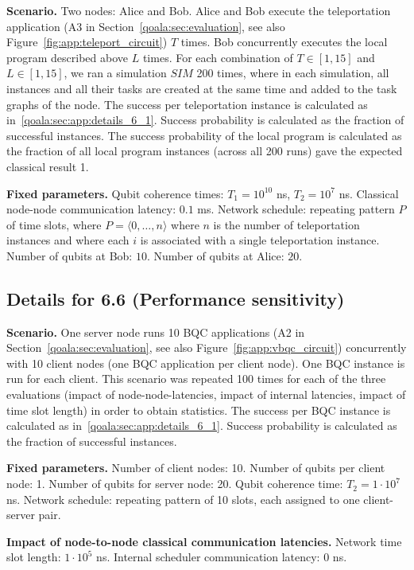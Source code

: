 \textbf{Scenario.}
Two nodes: Alice and Bob.
Alice and Bob execute the teleportation application (A3 in Section~\ref{qoala:sec:evaluation}, see also Figure~\ref{fig:app:teleport_circuit}) $T$ times.
Bob concurrently executes the local program described above $L$ times.
For each combination of $T \in [1, 15]$ and $L \in [1, 15]$, we ran a simulation $SIM$ 200 times, where in each simulation, all instances and all their tasks are created at the same time and added to the task graphs of the node.
The success per teleportation instance is calculated as in~\ref{qoala:sec:app:details_6_1}.
Success probability is calculated as the fraction of successful instances.
The success probability of the local program is calculated as the fraction of all local program instances (across all 200 runs) gave the expected classical result 1.

\textbf{Fixed parameters.}
Qubit coherence times: $T_1 = 10^{10}$ ns, $T_2 = 10^7$ ns.
Classical node-node communication latency: $0.1$ ms.
Network schedule: repeating pattern $P$ of time slots, where $P = \langle 0, \dots, n \rangle$ where $n$ is the number of teleportation instances and where each $i$ is associated with a single teleportation instance.
Number of qubits at Bob: $10$.
Number of qubits at Alice: $20$.


\subsection{Details for 6.6 (Performance sensitivity)}
\textbf{Scenario.}
One server node runs 10 BQC applications (A2 in Section~\ref{qoala:sec:evaluation}, see also Figure~\ref{fig:app:vbqc_circuit}) concurrently with 10 client nodes (one BQC application per client node).
One BQC instance is run for each client.
This scenario was repeated 100 times for each of the three evaluations (impact of node-node-latencies, impact of internal latencies, impact of time slot length) in order to obtain statistics.
The success per BQC instance is calculated as in~\ref{qoala:sec:app:details_6_1}.
Success probability is calculated as the fraction of successful instances.

\textbf{Fixed parameters.}
Number of client nodes: 10.
Number of qubits per client node: 1.
Number of qubits for server node: 20.
Qubit coherence time: $T_2 = 1\cdot 10^7$ ns.
Network schedule: repeating pattern of 10 slots, each assigned to one client-server pair.

\textbf{Impact of node-to-node classical communication latencies.}
Network time slot length: $1\cdot 10^5$ ns.
Internal scheduler communication latency: $0$ ns.

